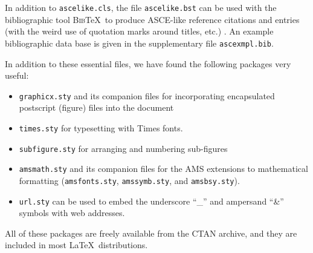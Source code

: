 \documentclass[Proceedings]{ascelike}
\begin{document}
\par
In addition to \texttt{ascelike.cls}, 
the file \texttt{ascelike.bst} can be used with
the bibliographic tool \textsc{Bib}\TeX\ to produce ASCE-like 
reference citations and entries (with the weird use of
quotation marks around titles, etc.) \cite{Kuhn:2011a}.
An example bibliographic data base is given in the
supplementary file \texttt{ascexmpl.bib}.
\par
In addition to these essential files,
we have found the following packages very useful:
%
\begin{itemize}
\item
\texttt{graphicx.sty} and its companion files for incorporating
encapsulated post\-script (figure) files into the document
\item
\texttt{times.sty} for typesetting with Times fonts.
\item
\texttt{subfigure.sty} for arranging and numbering sub-figures
\item
\texttt{amsmath.sty} and its companion files for the AMS extensions
to mathematical formatting (\texttt{amsfonts.sty}, \texttt{amssymb.sty},
and \texttt{amsbsy.sty}).
\item
\texttt{url.sty} can be used to embed the underscore ``\_'' and
ampersand ``\&'' symbols with web addresses.
\end{itemize}
%
All of these packages are freely 
available from the CTAN archive, 
and they are included in most \LaTeX\ distributions.
%
\end{document}
